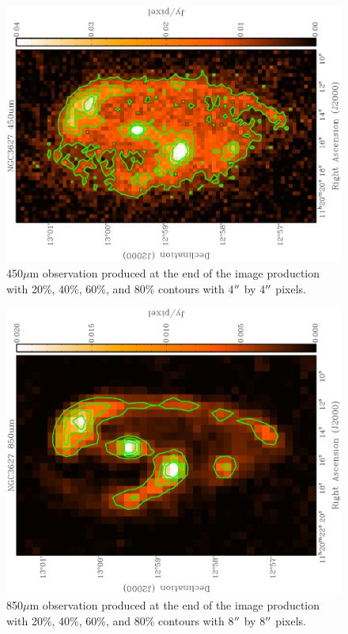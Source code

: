 \begin{figure}
  \centering
  \includegraphics[width=1.\textwidth,angle=270]{obs_imgs/450_um.eps}
  \caption[NGC3627 450$\mu$m Observations]{450$\mu$m observation produced at the end of the image production with 20\%, 40\%, 60\%, and 80\% contours with 4$\mbox{$^{\prime\prime}$}$ by 4$\mbox{$^{\prime\prime}$}$ pixels.}
    \label{fig_450}
\end{figure}

\begin{figure}
  \centering
  \includegraphics[width=1.\textwidth,angle=270]{obs_imgs/850_um.eps}
  \caption[NGC3627 850$\mu$m Observations]{850$\mu$m observation produced at the end of the image production with 20\%, 40\%, 60\%, and 80\% contours with 8$\mbox{$^{\prime\prime}$}$ by 8$\mbox{$^{\prime\prime}$}$ pixels.}
    \label{fig_850}
\end{figure}

